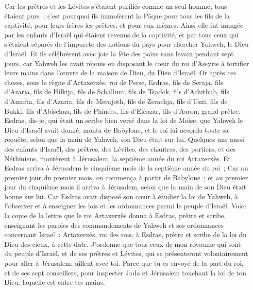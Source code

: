 \begin{multicols}{2}
Car les prêtres et les Lévites s'étaient purifiés comme un seul homme, tous étaient purs~; c'est pourquoi ils immolèrent la Pâque pour tous les fils de la captivité, pour leurs frères les prêtres, et pour eux-mêmes.
Ainsi elle fut mangée par les enfants d'Israël qui étaient revenus de la captivité, et par tous ceux qui s'étaient séparés de l'impureté des nations du pays pour chercher Yahweh, le Dieu d'Israël.
Et ils célébrèrent avec joie la fête des pains sans levain pendant sept jours, car Yahweh les avait réjouis en disposant le cœur du roi d'Assyrie à fortifier leurs mains dans l'œuvre de la maison de Dieu, du Dieu d'Israël.
\VerseOne{}Or après ces choses, sous le règne d'Artaxerxès, roi de Perse, Esdras, fils de Seraja, fils d'Azaria, fils de Hilkija,
fils de Schallum, fils de Tsadok, fils d'Achithub,
fils d'Amaria, fils d'Azaria, fils de Merajoth,
fils de Zerachja, fils d'Uzzi, fils de Bukki,
fils d'Abischua, fils de Phinées, fils d'Eléazar, fils d'Aaron, grand-prêtre.
Esdras, dis-je, qui était un scribe bien versé dans la loi de Moïse, que Yahweh le Dieu d'Israël avait donné, monta de Babylone, et le roi lui accorda toute sa requête, selon que la main de Yahweh, son Dieu était sur lui.
Quelques uns aussi des enfants d'Israël, des prêtres, des Lévites, des chantres, des portiers, et des Néthiniens, montèrent à Jérusalem, la septième année du roi Artaxerxès.
Et Esdras arriva à Jérusalem le cinquième mois de la septième année du roi~;
Car au premier jour du premier mois, on commença à partir de Babylone~; et au premier jour du cinquième mois il arriva à Jérusalem, selon que la main de son Dieu était bonne sur lui.
Car Esdras avait disposé son cœur à étudier la loi de Yahweh, à l'observer et à enseigner les lois et les ordonnances parmi le peuple d'Israël.
Voici la copie de la lettre que le roi Artaxerxès donna à Esdras, prêtre et scribe, enseignant les paroles des commandements de Yahweh et ses ordonnances concernant Israël~:
Artaxerxès, roi des rois, à Esdras, prêtre et scribe de la loi du Dieu des cieux, à cette date.
J'ordonne que tous ceux de mon royaume qui sont du peuple d'Israël, et de ses prêtres et Lévites, qui se présenteront volontairement pour aller à Jérusalem, aillent avec toi.
Parce que tu es envoyé de la part du roi, et de ses sept conseillers, pour inspecter Juda et Jérusalem touchant la loi de ton Dieu, laquelle est entre tes mains,

\end{multicols}
